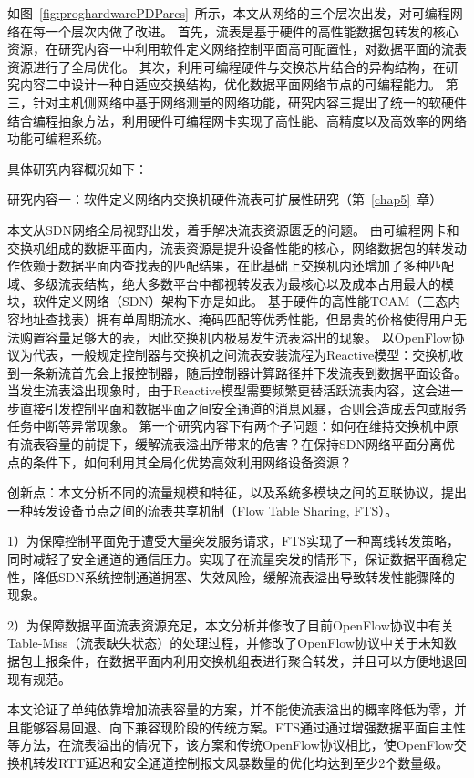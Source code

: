如图~\ref{fig:proghardwarePDParcs}~所示，本文从网络的三个层次出发，对可编程网络在每一个层次内做了改进。
首先，流表是基于硬件的高性能数据包转发的核心资源，在研究内容一中利用软件定义网络控制平面高可配置性，对数据平面的流表资源进行了全局优化。
其次，利用可编程硬件与交换芯片结合的异构结构，在研究内容二中设计一种自适应交换结构，优化数据平面网络节点的可编程能力。
第三，针对主机侧网络中基于网络测量的网络功能，研究内容三提出了统一的软硬件结合编程抽象方法，利用硬件可编程网卡实现了高性能、高精度以及高效率的网络功能可编程系统。


具体研究内容概况如下：

{\hei 研究内容一：软件定义网络内交换机硬件流表可扩展性研究（第~\ref{chap5}~章）}

{\hei 本文从SDN网络全局视野出发，着手解决流表资源匮乏的问题。}
由可编程网卡和交换机组成的数据平面内，流表资源是提升设备性能的核心，网络数据包的转发动作依赖于数据平面内查找表的匹配结果，在此基础上交换机内还增加了多种匹配域、多级流表结构，绝大多数平台中都视转发表为最核心以及成本占用最大的模块，软件定义网络（SDN）架构下亦是如此。
基于硬件的高性能TCAM（三态内容地址查找表）拥有单周期流水、掩码匹配等优秀性能，但昂贵的价格使得用户无法购置容量足够大的表，因此交换机内极易发生流表溢出的现象。
以OpenFlow协议为代表，一般规定控制器与交换机之间流表安装流程为Reactive模型：交换机收到一条新流首先会上报控制器，随后控制器计算路径并下发流表到数据平面设备。
当发生流表溢出现象时，由于Reactive模型需要频繁更替活跃流表内容，这会进一步直接引发控制平面和数据平面之间安全通道的消息风暴，否则会造成丢包或服务任务中断等异常现象。
第一个研究内容下有两个子问题：如何在维持交换机中原有流表容量的前提下，缓解流表溢出所带来的危害？在保持SDN网络平面分离优点的条件下，如何利用其全局化优势高效利用网络设备资源？


{\hei 创新点：}本文分析不同的流量规模和特征，以及系统多模块之间的互联协议，提出一种转发设备节点之间的流表共享机制（Flow Table Sharing, FTS）。

1）为保障控制平面免于遭受大量突发服务请求，FTS实现了一种离线转发策略，同时减轻了安全通道的通信压力。实现了在流量突发的情形下，保证数据平面稳定性，降低SDN系统控制通道拥塞、失效风险，缓解流表溢出导致转发性能骤降的现象。

2）为保障数据平面流表资源充足，本文分析并修改了目前OpenFlow协议中有关Table-Miss（流表缺失状态）的处理过程，并修改了OpenFlow协议中关于未知数据包上报条件，在数据平面内利用交换机组表进行聚合转发，并且可以方便地退回现有规范。

本文论证了单纯依靠增加流表容量的方案，并不能使流表溢出的概率降低为零，并且能够容易回退、向下兼容现阶段的传统方案。FTS通过通过增强数据平面自主性等方法，在流表溢出的情况下，该方案和传统OpenFlow协议相比，使OpenFlow交换机转发RTT延迟和安全通道控制报文风暴数量的优化均达到至少2个数量级。




